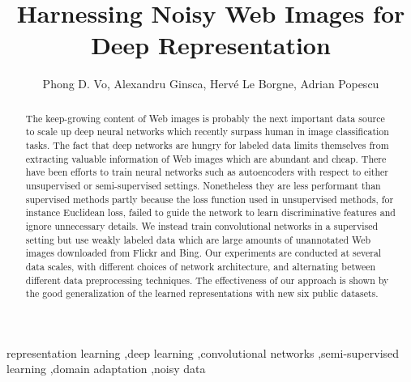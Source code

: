 \documentclass[preprint,12pt]{elsarticle}
\begin{document}
\begin{frontmatter}



\title{Harnessing Noisy Web Images for Deep Representation}

\author{Phong D. Vo, Alexandru Ginsca, Herv\'e Le Borgne, Adrian Popescu}
\address{Vision \& Content Engineering Laboratory \\CEA LIST, France}

\author{}

\address{}

\begin{abstract}
The keep-growing content of Web images is probably the next important data source to scale up deep neural networks which recently surpass human in image classification tasks. The fact that deep networks are hungry for labeled data limits themselves from extracting valuable information of Web images which are abundant and cheap. There have been efforts to train neural networks such as autoencoders with respect to either unsupervised or semi-supervised settings. Nonetheless they are less performant than supervised methods partly because the loss function used in unsupervised methods, for instance Euclidean loss, failed to guide the network to learn discriminative features and ignore unnecessary details. We instead train convolutional networks in a supervised setting but use weakly labeled data which are large amounts of unannotated Web images downloaded from Flickr and Bing. Our experiments are conducted at several data scales, with different choices of network architecture, and alternating between different data preprocessing techniques. The effectiveness of our approach is shown by the good generalization of the learned representations with new six public datasets. 
\end{abstract}

\begin{keyword}
representation learning \sep deep learning \sep convolutional networks \sep semi-supervised learning \sep domain adaptation \sep noisy data



\end{keyword}

\end{frontmatter}
\end{document}
